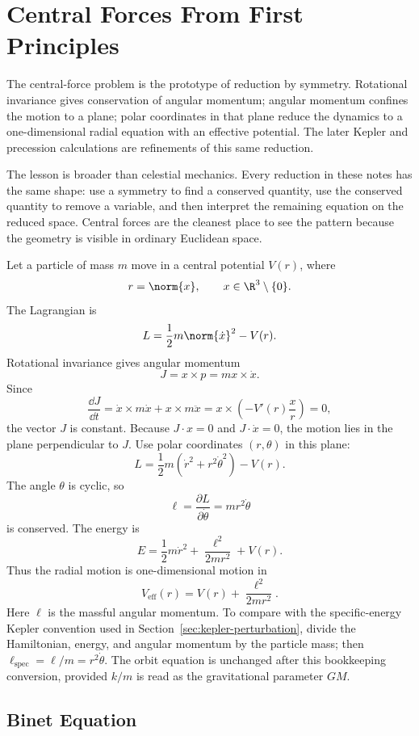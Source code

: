 \section{Central Forces From First Principles}
\label{sec:detailed-central-forces}

The central-force problem is the prototype of reduction by symmetry. Rotational
invariance gives conservation of angular momentum; angular momentum confines
the motion to a plane; polar coordinates in that plane reduce the dynamics to a
one-dimensional radial equation with an effective potential. The later Kepler
and precession calculations are refinements of this same reduction.

The lesson is broader than celestial mechanics. Every reduction in these notes
has the same shape: use a symmetry to find a conserved quantity, use the
conserved quantity to remove a variable, and then interpret the remaining
equation on the reduced space. Central forces are the cleanest place to see the
pattern because the geometry is visible in ordinary Euclidean space.

Let a particle of mass \(m\) move in a central potential \(V(r)\), where
\[
  r=\norm{x},
  \qquad
  x\in\R^3\setminus\{0\}.
\]
The Lagrangian is
\[
  L=\frac12m\norm{\dot x}^2-V(r).
\]
Rotational invariance gives angular momentum
\[
  J=x\times p=m x\times\dot x.
\]
Since
\[
  \frac{\dd J}{\dd t}
  =
  \dot x\times m\dot x+x\times m\ddot x
  =
  x\times\left(-V'(r)\frac{x}{r}\right)=0,
\]
the vector \(J\) is constant. Because \(J\cdot x=0\) and
\(J\cdot\dot x=0\), the motion lies in the plane perpendicular to \(J\). Use
polar coordinates \((r,\theta)\) in this plane:
\[
  L=\frac12m(\dot r^2+r^2\dot\theta^2)-V(r).
\]
The angle \(\theta\) is cyclic, so
\[
  \ell=\frac{\partial L}{\partial\dot\theta}=mr^2\dot\theta
\]
is conserved. The energy is
\[
  E=\frac12m\dot r^2+\frac{\ell^2}{2mr^2}+V(r).
\]
Thus the radial motion is one-dimensional motion in
\[
  V_{\mathrm{eff}}(r)
  =
  V(r)+\frac{\ell^2}{2mr^2}.
\]
Here \(\ell\) is the massful angular momentum. To compare with the
specific-energy Kepler convention used in
Section~\ref{sec:kepler-perturbation}, divide the Hamiltonian, energy, and
angular momentum by the particle mass; then
\(\ell_{\mathrm{spec}}=\ell/m=r^2\dot\theta\). The orbit equation is unchanged
after this bookkeeping conversion, provided \(k/m\) is read as the
gravitational parameter \(GM\).

\subsection{Binet Equation}
\label{subsec:detailed-binet}

